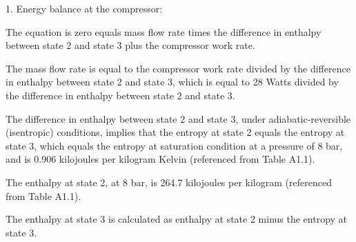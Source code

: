 1. Energy balance at the compressor:

The equation is zero equals mass flow rate times the difference in enthalpy between state 2 and state 3 plus the compressor work rate.

The mass flow rate is equal to the compressor work rate divided by the difference in enthalpy between state 2 and state 3, which is equal to 28 Watts divided by the difference in enthalpy between state 2 and state 3.

The difference in enthalpy between state 2 and state 3, under adiabatic-reversible (isentropic) conditions, implies that the entropy at state 2 equals the entropy at state 3, which equals the entropy at saturation condition at a pressure of 8 bar, and is 0.906 kilojoules per kilogram Kelvin (referenced from Table A1.1).

The enthalpy at state 2, at 8 bar, is 264.7 kilojoules per kilogram (referenced from Table A1.1).

The enthalpy at state 3 is calculated as enthalpy at state 2 minus the entropy at state 3.